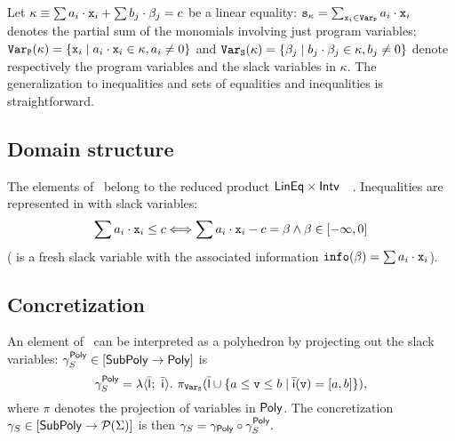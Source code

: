 \documentclass[sttt]{svjour}
\begin{document}
Let  $\kappa \equiv \sum a_i \cdot \mathtt{x}_{i} +  \sum b_j \cdot \beta_{j} = c$ be a linear equality:
$\mathtt{s_\kappa} = \sum_{\mathtt{x}_i \in \mathtt{Var}_\mathtt{P}} a_i \cdot \mathtt{x}_i$ denotes the partial sum of the monomials involving just program variables;
 $\mathtt{Var}_\mathtt{P}(\kappa) = \{ \mathtt{x}_{i} \mid a_i \cdot \mathtt{x}_{i} \in \kappa, a_i \neq 0  \}$ and   $\mathtt{Var}_\mathtt{S}(\kappa) = \{ \beta_{j} \mid b_j \cdot \beta_{j} \in \kappa, b_j \neq 0  \}$ denote respectively the program variables and the slack variables  in $\kappa$.
The generalization to inequalities and sets of equalities and inequalities is straightforward.


\subsection{Domain structure}

The elements of \SubPoly\ belong to the reduced product $\mathsf{LinEq} \times \mathsf{Intv}$~~\cite{CousotCousot79}.
Inequalities are represented in \SubPoly{}  with slack variables:
\[\sum a_i \cdot \mathtt{x}_{i} \leq c \Longleftrightarrow \sum a_i \cdot \mathtt{x}_{i} - c = \beta_{} \wedge \beta_{} \in [-\infty, 0]
\] 
(\slackvar{} is a fresh slack variable with the  associated information  $\mathtt{info}(\beta_{}) = \sum a_i \cdot \mathtt{x}_{i}$). 



\subsection{Concretization}
An element of \Subpoly\ can be interpreted as a polyhedron by projecting out the slack variables: $\gamma^{\mathsf{Poly}}_{S} \in [\mathsf{SubPoly} \rightarrow\mathsf{Poly}]$ is
\[
\gamma^\Poly_{S} = \lambda \subpolyPair{}{}.\ \pi_{\VarSlack}(\ael{l} \cup \{ a \leq \var \leq b \mid \ael{i}(\var) = [a, b]  \} )
,\]
 where $\pi$ denotes the projection of variables in $\mathsf{Poly}$.
The concretization   $\gamma_{S} \in [\mathsf{SubPoly} \rightarrow\mathcal{P}{(\Sigma)}]$ is then
$
\gamma_{S} = \gamma_{\mathsf{Poly}} \circ \gamma^{\mathsf{Poly}}_{S}.
$
\end{document}
